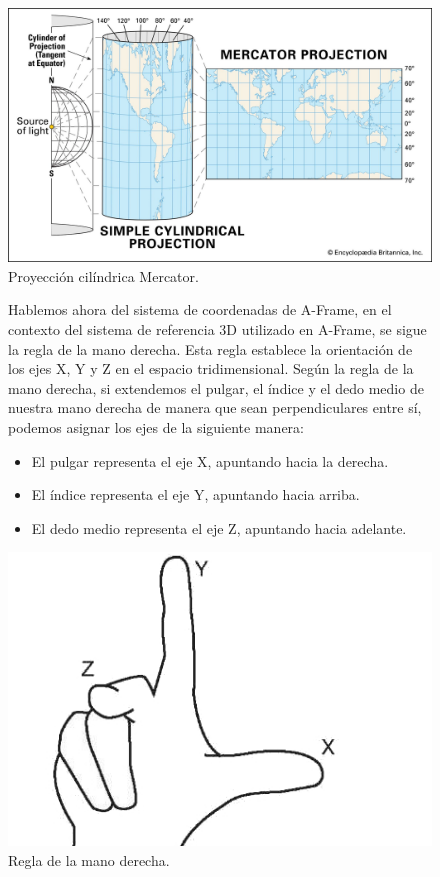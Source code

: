 \documentclass[a4paper, 11pt]{book}
\begin{document}
\begin{figure}[H]
  \centering
  \includegraphics[width=12cm, keepaspectratio]{img/simple-cylindrical-projection-earth-map-globe-mercator.jpg}
  \caption{Proyección cilíndrica Mercator.}
  \label{fig:mercator}
\end{figure}

\begin{figure}[H]
\begin{minipage}{0.7\textwidth}
Hablemos ahora del sistema de coordenadas de A-Frame, en el contexto del sistema de referencia 3D utilizado en A-Frame, se sigue la regla de la mano derecha. Esta regla establece la orientación de los ejes X, Y y Z en el espacio tridimensional.
Según la regla de la mano derecha, si extendemos el pulgar, el índice y el dedo medio de nuestra mano derecha de manera que sean perpendiculares entre sí, podemos asignar los ejes de la siguiente manera:
\begin{itemize}
    \item El pulgar representa el eje X, apuntando hacia la derecha.
    \item El índice representa el eje Y, apuntando hacia arriba.
    \item El dedo medio representa el eje Z, apuntando hacia adelante.
    
\end{itemize}
\end{minipage}
\hfill
\begin{minipage}{0.25\textwidth}
\includegraphics[width=\textwidth]{img/rightHand.jpg}
\caption{Regla de la mano derecha.}
\label{fig:rightHand}
\end{minipage}
\end{figure}
\end{document}
